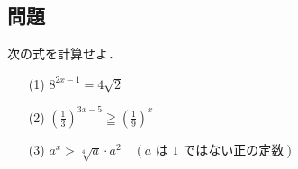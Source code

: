 \documentclass[8pt,dvipdfmx]{article}[b5paper]
\begin{document}
\begin{tcolorbox}[title=数学\textcircled{2} 1-2 ABC]
\section*{問題}
次の式を計算せよ．

\begin{enumerate}
    \item[(1)] $8^{2x-1} = 4\sqrt{2}$

    \vspace{2mm} %

    \item[(2)] $\left(\frac{1}{3}\right)^{3x-5} \geqq \left(\frac{1}{9}\right)^x $

    \vspace{2mm} %

    \item[(3)] $a^x > \sqrt[4]{a} \cdot a^2 \quad (a \text{ は 1 ではない正の定数})$
    
 
\end{enumerate}
\end{tcolorbox}

\end{document}
